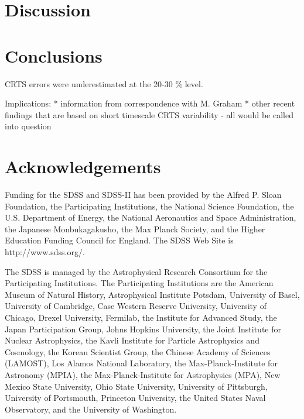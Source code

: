 \documentclass[a4paper,fleqn,usenatbib]{mnras}
\begin{document}
\section{Discussion}
\label{sec:discussion}

\section{Conclusions}
\label{sec:conclusions}
CRTS errors were underestimated at the 20-30 \% level.

Implications:  * information from correspondence with M. Graham  
* other recent findings that are based on short timescale CRTS variability  - all would be called into question  



\section*{Acknowledgements}

Funding for the SDSS and SDSS-II has been provided by the Alfred P. Sloan Foundation, the Participating Institutions, the National Science Foundation, the U.S. Department of Energy, the National Aeronautics and Space Administration, the Japanese Monbukagakusho, the Max Planck Society, and the Higher Education Funding Council for England. The SDSS Web Site is http://www.sdss.org/.

The SDSS is managed by the Astrophysical Research Consortium for the Participating Institutions. The Participating Institutions are the American Museum of Natural History, Astrophysical Institute Potsdam, University of Basel, University of Cambridge, Case Western Reserve University, University of Chicago, Drexel University, Fermilab, the Institute for Advanced Study, the Japan Participation Group, Johns Hopkins University, the Joint Institute for Nuclear Astrophysics, the Kavli Institute for Particle Astrophysics and Cosmology, the Korean Scientist Group, the Chinese Academy of Sciences (LAMOST), Los Alamos National Laboratory, the Max-Planck-Institute for Astronomy (MPIA), the Max-Planck-Institute for Astrophysics (MPA), New Mexico State University, Ohio State University, University of Pittsburgh, University of Portsmouth, Princeton University, the United States Naval Observatory, and the University of Washington. 





%



\bsp	%
\label{lastpage}
\end{document}
